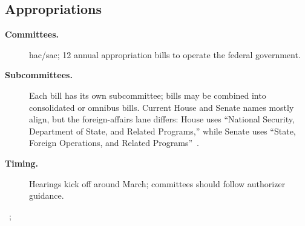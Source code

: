 \documentclass[../main.tex]{subfiles}
\begin{document}
\subsection{Appropriations}
\begin{description}
  \item[\textbf{Committees.}] \ac{hac}/\ac{sac}; 12 annual appropriation bills to operate the federal government.
  \item[\textbf{Subcommittees.}] Each bill has its own subcommittee; bills may be combined into consolidated or
  omnibus bills. Current House and Senate names mostly align, but the foreign-affairs lane differs: House uses
  ``National Security, Department of State, and Related Programs,'' while Senate uses ``State, Foreign Operations,
  and Related Programs''~\autocite{HAC-Subcommittees-2026,SAC-Subcommittees-2026}.
  \item[\textbf{Timing.}] Hearings kick off around March; committees should follow authorizer guidance.
\end{description}
~\autocite{CRS-R47235-Budget-Process-Timeline,CRS-R46497-Authorizations-Appropriations,HAC-Subcommittees-2026,SAC-Subcommittees-2026,SAC-Committee-Jurisdiction-2026}; 
\end{document}
